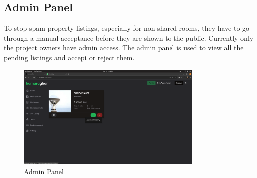 \par\bigskip\bigskip
\subsection{Admin Panel}
To stop spam property listings, especially for non-shared rooms, they have to go through a manual acceptance before they are shown to the public.
Currently only the project owners have admin access. The admin panel is used to view all the pending listings and accept or reject them.

\begin{figure}[h]
    \centering
    \includegraphics[width=0.8\textwidth]{Images/screenshots/admin.png}
    \caption{Admin Panel}
\end{figure}